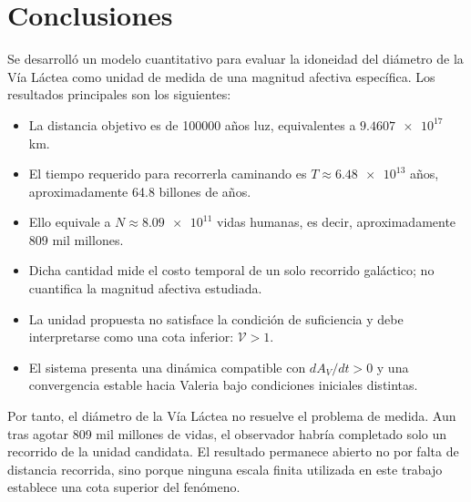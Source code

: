 \documentclass[conference]{IEEEtran}
\newcommand{\Vcoef}{\mathcal{V}}
\begin{document}
\section{Conclusiones}
\label{sec:conclusiones}

Se desarrolló un modelo cuantitativo para evaluar la idoneidad del diámetro de
la Vía Láctea como unidad de medida de una magnitud afectiva específica. Los
resultados principales son los siguientes:

\begin{itemize}
\item La distancia objetivo es de \num{100000} años luz, equivalentes a
      $\num{9.4607e17}$ km.
\item El tiempo requerido para recorrerla caminando es
      $T \approx \num{6.48e13}$ años, aproximadamente \num{64.8} billones de
      años.
\item Ello equivale a $N \approx \num{8.09e11}$ vidas humanas, es decir,
      aproximadamente \num{809} mil millones.
\item Dicha cantidad mide el costo temporal de un solo recorrido galáctico; no
      cuantifica la magnitud afectiva estudiada.
\item La unidad propuesta no satisface la condición de suficiencia y debe
      interpretarse como una cota inferior: $\Vcoef>1$.
\item El sistema presenta una dinámica compatible con $dA_V/dt>0$ y una
      convergencia estable hacia Valeria bajo condiciones iniciales distintas.
\end{itemize}

Por tanto, el diámetro de la Vía Láctea no resuelve el problema de medida. Aun
tras agotar \num{809} mil millones de vidas, el observador habría completado
solo un recorrido de la unidad candidata. El resultado permanece abierto no
por falta de distancia recorrida, sino porque ninguna escala finita utilizada
en este trabajo establece una cota superior del fenómeno.
\end{document}
